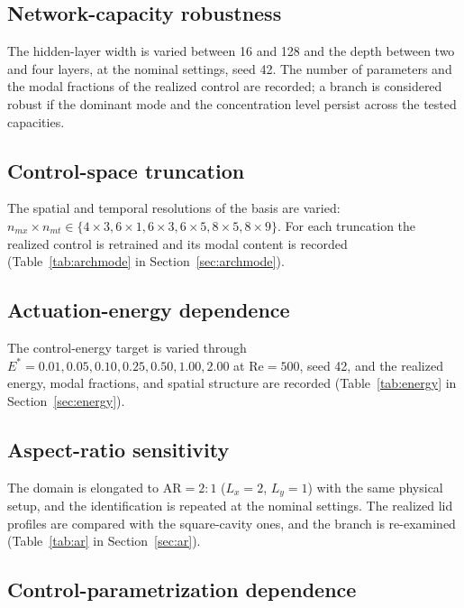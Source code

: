 \documentclass[aip,pof,reprint,superscriptaddress]{revtex4-2}
\newcommand{\re}{\mathrm{Re}}
\begin{document}
\subsection{Network-capacity robustness}\label{sec:arch}

The hidden-layer width is varied between 16 and 128 and the depth between two and four layers, at the nominal settings, seed 42. The number of parameters and the modal fractions of the realized control are recorded; a branch is considered robust if the dominant mode and the concentration level persist across the tested capacities.

\subsection{Control-space truncation}\label{sec:modecount}

The spatial and temporal resolutions of the basis are varied: $n_{mx}\times n_{mt}\in\{4\times3,6\times1,6\times3,6\times5,8\times5,8\times9\}$. For each truncation the realized control is retrained and its modal content is recorded (Table~\ref{tab:archmode} in Section~\ref{sec:archmode}).

\subsection{Actuation-energy dependence}\label{sec:energy-methods}

The control-energy target is varied through $E^*=0.01,0.05,0.10,0.25,0.50,1.00,2.00$ at $\re=500$, seed 42, and the realized energy, modal fractions, and spatial structure are recorded (Table~\ref{tab:energy} in Section~\ref{sec:energy}).

\subsection{Aspect-ratio sensitivity}\label{sec:ar-methods}

The domain is elongated to $\mathrm{AR}=2{:}1$ ($L_x=2$, $L_y=1$) with the same physical setup, and the identification is repeated at the nominal settings. The realized lid profiles are compared with the square-cavity ones, and the branch is re-examined (Table~\ref{tab:ar} in Section~\ref{sec:ar}).

\subsection{Control-parametrization dependence}\label{sec:param-methods}
\end{document}
